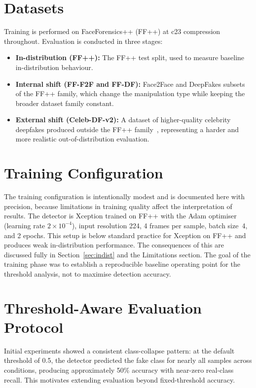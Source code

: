 \documentclass[a4paper,12pt]{report}
\begin{document}
\section{Datasets}

Training is performed on FaceForensics++ (FF++) at c23
compression throughout.
Evaluation is conducted in three stages:

\begin{itemize}
  \item \textbf{In-distribution (FF++):}
        The FF++ test split, used to measure baseline
        in-distribution behaviour.

  \item \textbf{Internal shift (FF-F2F and FF-DF):}
        Face2Face and DeepFakes subsets of the FF++ family,
        which change the manipulation type while keeping
        the broader dataset family constant.

  \item \textbf{External shift (Celeb-DF-v2):}
        A dataset of higher-quality celebrity deepfakes
        produced outside the FF++ family~\cite{li2020celebdf},
        representing a harder and more realistic
        out-of-distribution evaluation.
\end{itemize}

\section{Training Configuration}

The training configuration is intentionally modest and
is documented here with precision, because limitations
in training quality affect the interpretation of results.
The detector is Xception trained on FF++ with the Adam
optimiser (learning rate $2 \times 10^{-4}$), input
resolution 224, 4 frames per sample, batch size~4,
and 2 epochs.
This setup is below standard practice for Xception on
FF++ and produces weak in-distribution performance.
The consequences of this are discussed fully in
Section~\ref{sec:indist} and the Limitations section.
The goal of the training phase was to establish a
reproducible baseline operating point for the threshold
analysis, not to maximise detection accuracy.

\section{Threshold-Aware Evaluation Protocol}
\label{sec:protocol}

Initial experiments showed a consistent class-collapse
pattern: at the default threshold of 0.5, the detector
predicted the fake class for nearly all samples across
conditions, producing approximately 50\% accuracy with
near-zero real-class recall.
This motivates extending evaluation beyond fixed-threshold
accuracy.
\end{document}
